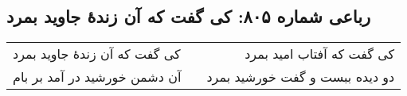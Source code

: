\begin{center}
\section*{رباعی شماره ۸۰۵: کی گفت که آن زندهٔ جاوید بمرد}
\label{sec:0805}
\begin{longtable}{l p{0.5cm} r}
کی گفت که آن زندهٔ جاوید بمرد
&&
کی گفت که آفتاب امید بمرد
\\
آن دشمن خورشید در آمد بر بام
&&
دو دیده ببست و گفت خورشید بمرد
\\
\end{longtable}
\end{center}
